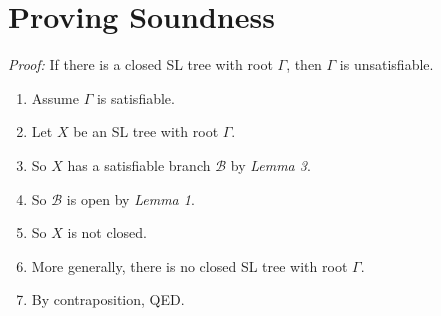 \documentclass[a4paper, 11pt]{article} %
\newcommand{\B}{\mathcal{B}}
\begin{document}
\section*{Proving Soundness}

\textit{Proof:} If there is a closed SL tree with root $\Gamma$, then $\Gamma$ is unsatisfiable. 

\begin{enumerate}
  \item Assume $\Gamma$ is satisfiable. 
  \item Let $X$ be an SL tree with root $\Gamma$. 
  \item So $X$ has a satisfiable branch $\B$ by \textit{Lemma 3}. 
  \item So $\B$ is open by \textit{Lemma 1}. 
  \item So $X$ is not closed. 
  \item More generally, there is no closed SL tree with root $\Gamma$. 
  \item By contraposition, QED.
\end{enumerate}
\end{document}
